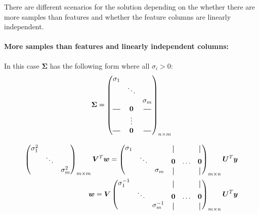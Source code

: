 There are different scenarios for the solution depending on the 
whether there are more samples than features and whether the feature columns are linearly independent.

\paragraph{More samples than features and linearly independent columns:}
In this case $\bm{\Sigma}$ has the following form where all $\sigma_i>0$:
\begin{align}
    \bm{\Sigma} = 
    \begin{pmatrix}
        \sigma_{1} &        &                \\
                     & \ddots &              \\
                     &        &  \sigma_{m}  \\
        \horzbar     & \bm{0} &  \horzbar    \\
                     & \vdots &              \\
        \horzbar     & \bm{0} &  \horzbar    \\
    \end{pmatrix}_{n \x m}
\end{align}

\begin{align}
    \begin{pmatrix}
        \sigma_{1}^2 &        &               \\
                     & \ddots &               \\
                     &        &  \sigma_{m}^2 \\
    \end{pmatrix}_{m \x m} \bm{V}^T \bm{w} = 
    \begin{pmatrix}
        \sigma_{1} &        &                & \vertbar &        & \vertbar \\
                     & \ddots &              & \bm{0}   & \hdots & \bm{0}   \\
                     &        &  \sigma_{m}  & \vertbar &        & \vertbar \\
    \end{pmatrix}_{m \x n}\bm{U}^T \bm{y} \\
     \bm{w} = 
    \bm{V}
    \begin{pmatrix}
        \sigma_{1}^{-1} &        &                & \vertbar &        & \vertbar \\
                     & \ddots &              & \bm{0}   & \hdots & \bm{0}   \\
                     &        &  \sigma_{m}^{-1}  & \vertbar &        & \vertbar \\
    \end{pmatrix}_{m \x n}\bm{U}^T \bm{y}
\end{align}

